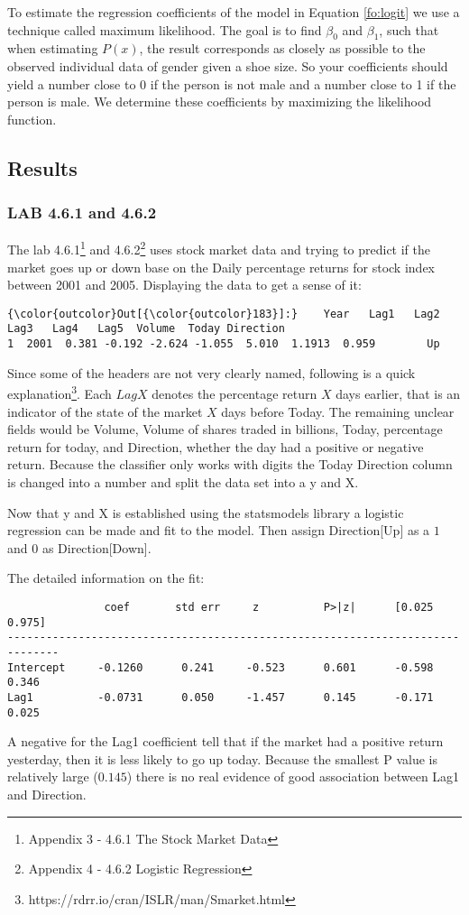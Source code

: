 To estimate the regression coefficients of the model in Equation \ref{fo:logit} we use a technique called maximum likelihood. The goal is to find $\beta_0$ and $\beta_1$, such that when estimating $P(x)$, the result corresponds as closely as possible to the observed individual data of gender given a shoe size. So your coefficients should yield a number close to 0 if the person is not male and a number close to 1 if the person is male. We determine these coefficients by maximizing the likelihood function.


\subsection{Results}
\subsubsection*{LAB 4.6.1 and 4.6.2}
The lab 4.6.1\footnote{Appendix 3 - 4.6.1 The Stock Market Data} and 4.6.2\footnote{Appendix 4 - 4.6.2 Logistic Regression} uses stock market data and trying to predict if the market goes up or down base on the Daily percentage returns for stock index between 2001 and 2005.
Displaying the data to get a sense of it:
\begin{Verbatim}[commandchars=\\\{\}]
{\color{outcolor}Out[{\color{outcolor}183}]:}    Year   Lag1   Lag2   Lag3   Lag4   Lag5  Volume  Today Direction
1  2001  0.381 -0.192 -2.624 -1.055  5.010  1.1913  0.959        Up
\end{Verbatim}
Since some of the headers are not very clearly named, following is a quick explanation\footnote{https://rdrr.io/cran/ISLR/man/Smarket.html}. Each $LagX$ denotes the percentage return $X$ days earlier, that is an indicator of the state of the market $X$ days before Today. The remaining unclear fields would be Volume, Volume of shares traded in billions, Today, percentage return for today, and Direction, whether the day had a positive or negative return. Because the classifier only works with digits the Today Direction column is changed into a number and split the data set into a y and X.

Now that y and X is established using the statsmodels library a logistic regression can be made and fit to the model. Then assign Direction[Up] as a $1$ and $0$ as Direction[Down].

The detailed information on the fit:
\begin{lstlisting}
               coef       std err     z          P>|z|      [0.025      0.975]
------------------------------------------------------------------------------
Intercept     -0.1260      0.241     -0.523      0.601      -0.598       0.346
Lag1          -0.0731      0.050     -1.457      0.145      -0.171       0.025
\end{lstlisting}
A negative for the Lag1 coefficient tell that if the market had a positive return yesterday, then it is less likely to go up today. Because the smallest P value is relatively large ($0.145$) there is no real evidence of good association between Lag1 and Direction.

